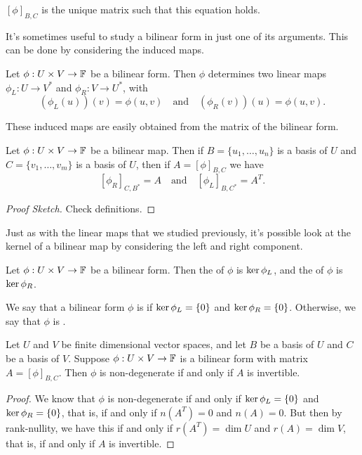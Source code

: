 \documentclass[a4paper]{scrartcl}
\begin{document}
\begin{remark}
    $[\phi]_{B, C}$ is the unique matrix such that this equation holds.
\end{remark}

It's sometimes useful to study a bilinear form in just one of its arguments. This can be done by considering the induced maps.

\begin{definition}    
    Let $\phi: U \times V \rightarrow \mathbb{F}$ be a bilinear form. Then $\phi$ determines two linear maps $\phi_L: U \rightarrow V^*$ and $\phi_R: V\rightarrow U^*$, with
    $$
    (\phi_L(u))(v) = \phi(u, v) \quad \text{and} \quad (\phi_R(v))(u) = \phi(u, v).
    $$
\end{definition}

These induced maps are easily obtained from the matrix of the bilinear form.

\begin{lemma}
    Let $\phi: U \times V \rightarrow \mathbb{F}$ be a bilinear map.
    Then if $B = \{u_1, \dots, u_n\}$ is a basis of $U$ and $C = \{v_1, \dots, v_m\}$ is a basis of $U$, then if $A = [\phi]_{B, C}$ we have
    $$
    [\phi_R]_{C, B^*} = A \quad \text{and} \quad [\phi_L]_{B, C^*} = A^T.
    $$
\end{lemma}
\begin{proof}[Proof Sketch]
    Check definitions.
\end{proof}

Just as with the linear maps that we studied previously, it's possible look at the kernel of a bilinear map by considering the left and right component.

\begin{definition}
    Let $\phi: U \times V \rightarrow \mathbb{F}$ be a bilinear form. Then the  of $\phi$ is $\operatorname{ker} \phi_L$, and the  of $\phi$ is $\operatorname{ker} \phi_R$.
\end{definition}

\begin{definition}[Degeneracy]
    We say that a bilinear form $\phi$ is  if $\operatorname{ker} \phi_L = \{0\}$ and $\operatorname{ker} \phi_R = \{0\}$. Otherwise, we say that $\phi$ is . 
\end{definition}

\begin{lemma}
    Let $U$ and $V$ be finite dimensional vector spaces, and 
let $B$ be a basis of $U$ and $C$ be a basis of $V$. 
Suppose $\phi: U \times V \rightarrow \mathbb{F}$ is a bilinear form with matrix $A = [\phi]_{B, C}$. Then $\phi$ is non-degenerate if and only if $A$ is invertible.
\end{lemma}
\begin{proof}
    We know that $\phi$ is non-degenerate if and only if $\operatorname{ker} \phi_L = \{0\}$ and $\operatorname{ker} \phi_R = \{0\}$, that is, if and only if $n(A^T) = 0$ and $n(A) = 0$. But then by rank-nullity, we have this if and only if $r(A^T) = \dim U$ and $r(A) = \dim V$, that is, if and only if $A$ is invertible.
\end{proof}
\end{document}

